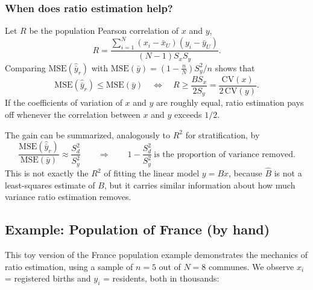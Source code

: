\documentclass[
  letterpaper,
  DIV=11,
  numbers=noendperiod]{scrreprt}
\renewcommand{\[}{\begin{equation}}
\renewcommand{\]}{\end{equation}}
\begin{document}
\subsubsection{When does ratio estimation
help?}\label{when-does-ratio-estimation-help}

Let \(R\) be the population Pearson correlation of \(x\) and \(y\), \[
R = \frac{\sum_{i=1}^N (x_i - \bar x_U)(y_i - \bar y_U)}{(N-1)S_xS_y}.
\] Comparing \(\text{MSE}(\hat{\bar y}_r)\) with
\(\text{MSE}(\bar y) = \left(1 - \frac nN\right)S_y^2/n\) shows that \[
\text{MSE}(\hat{\bar y}_r) \le \text{MSE}(\bar y)
\quad\Longleftrightarrow\quad
R \ge \frac{B S_x}{2 S_y} = \frac{\text{CV}(x)}{2\,\text{CV}(y)} .
\] If the coefficients of variation of \(x\) and \(y\) are roughly
equal, ratio estimation pays off whenever the correlation between \(x\)
and \(y\) exceeds \(1/2\).

The gain can be summarized, analogously to \(R^2\) for stratification,
by \[
\frac{\text{MSE}(\hat{\bar y}_r)}{\text{MSE}(\bar y)} \approx \frac{S_d^2}{S_y^2}
\qquad\Longrightarrow\qquad
1 - \frac{S_d^2}{S_y^2}\ \text{is the proportion of variance removed.}
\] This is not exactly the \(R^2\) of fitting the linear model
\(y = Bx\), because \(\hat B\) is not a least-squares estimate of \(B\),
but it carries similar information about how much variance ratio
estimation removes.

\subsection{Example: Population of France (by
hand)}\label{example-population-of-france-by-hand}

This toy version of the France population example demonstrates the
mechanics of ratio estimation, using a sample of \(n = 5\) out of
\(N = 8\) communes. We observe \(x_i\) = registered births and \(y_i\) =
residents, both in thousands:
\end{document}
